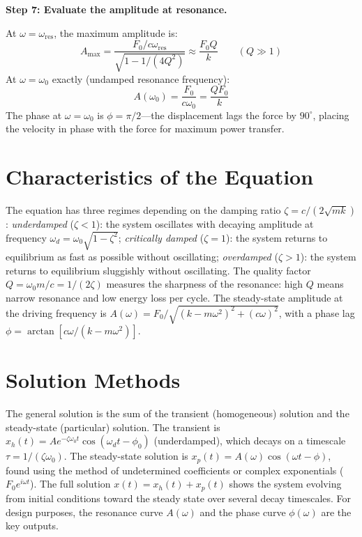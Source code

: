 \textbf{Step 7: Evaluate the amplitude at resonance.}

At $\omega = \omega_{\text{res}}$, the maximum amplitude is:
\begin{equation}
A_{\text{max}} = \frac{F_0/c\omega_{\text{res}}}{\sqrt{1 - 1/(4Q^2)}} \approx \frac{F_0 Q}{k} \qquad (Q \gg 1)
\end{equation}
At $\omega = \omega_0$ exactly (undamped resonance frequency):
\begin{equation}
A(\omega_0) = \frac{F_0}{c\omega_0} = \frac{QF_0}{k}
\end{equation}
The phase at $\omega = \omega_0$ is $\phi = \pi/2$---the displacement lags the force by $90^\circ$, placing the velocity in phase with the force for maximum power transfer.

\section*{Characteristics of the Equation}

The equation has three regimes depending on the damping ratio $\zeta = c/(2\sqrt{mk})$: \textit{underdamped} ($\zeta < 1$): the system oscillates with decaying amplitude at frequency $\omega_d = \omega_0\sqrt{1-\zeta^2}$; \textit{critically damped} ($\zeta = 1$): the system returns to equilibrium as fast as possible without oscillating; \textit{overdamped} ($\zeta > 1$): the system returns to equilibrium sluggishly without oscillating. The quality factor $Q = \omega_0 m/c = 1/(2\zeta)$ measures the sharpness of the resonance: high $Q$ means narrow resonance and low energy loss per cycle. The steady-state amplitude at the driving frequency is $A(\omega) = F_0/\sqrt{(k - m\omega^2)^2 + (c\omega)^2}$, with a phase lag $\phi = \arctan[c\omega/(k - m\omega^2)]$.
\section*{Solution Methods}

The general solution is the sum of the transient (homogeneous) solution and the steady-state (particular) solution. The transient is $x_h(t) = Ae^{-\zeta\omega_0 t}\cos(\omega_d t - \phi_0)$ (underdamped), which decays on a timescale $\tau = 1/(\zeta\omega_0)$. The steady-state solution is $x_p(t) = A(\omega)\cos(\omega t - \phi)$, found using the method of undetermined coefficients or complex exponentials ($F_0 e^{i\omega t}$). The full solution $x(t) = x_h(t) + x_p(t)$ shows the system evolving from initial conditions toward the steady state over several decay timescales. For design purposes, the resonance curve $A(\omega)$ and the phase curve $\phi(\omega)$ are the key outputs.
